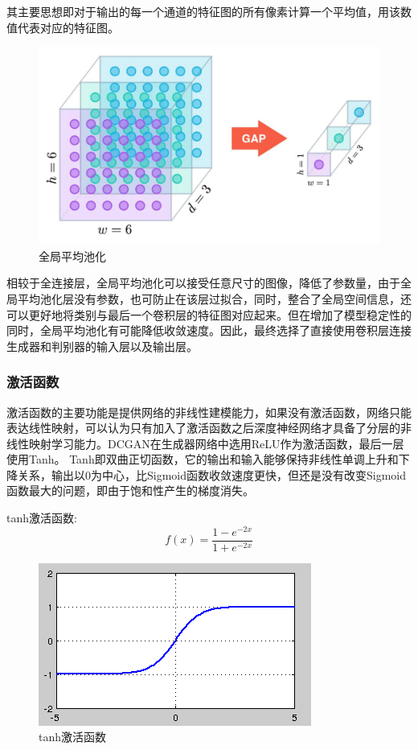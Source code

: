 \documentclass[hyperref, a4paper]{ctexart}
\begin{document}
其主要思想即对于输出的每一个通道的特征图的所有像素计算一个平均值，用该数值代表对应的特征图。

\begin{figure}
\centering
\includegraphics{./11.jpg}
\caption{全局平均池化}
\end{figure}

相较于全连接层，全局平均池化可以接受任意尺寸的图像，降低了参数量，由于全局平均池化层没有参数，也可防止在该层过拟合，同时，整合了全局空间信息，还可以更好地将类别与最后一个卷积层的特征图对应起来。但在增加了模型稳定性的同时，全局平均池化有可能降低收敛速度。因此，最终选择了直接使用卷积层连接生成器和判别器的输入层以及输出层。

\hypertarget{ux6fc0ux6d3bux51fdux6570}{%
\subsubsection{激活函数}\label{ux6fc0ux6d3bux51fdux6570}}

激活函数的主要功能是提供网络的非线性建模能力，如果没有激活函数，网络只能表达线性映射，可以认为只有加入了激活函数之后深度神经网络才具备了分层的非线性映射学习能力。DCGAN在生成器网络中选用ReLU作为激活函数，最后一层使用Tanh。
Tanh即双曲正切函数，它的输出和输入能够保持非线性单调上升和下降关系，输出以0为中心，比Sigmoid函数收敛速度更快，但还是没有改变Sigmoid函数最大的问题，即由于饱和性产生的梯度消失。

tanh激活函数:\[f(x) = \frac{1-e^{-2x}}{1 + e^{-2x}}\]

\begin{figure}
\centering
\includegraphics{./13.jpg}
\caption{tanh激活函数}
\end{figure}
\end{document}
